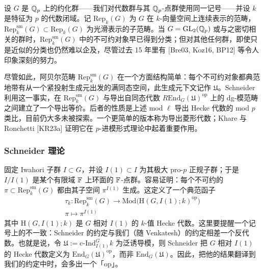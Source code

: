 设 $G$ 是 $\mathbb{Q}_p$ 上的约化群——我们对代数群与其 $\mathbb{Q}_p$-点群使用同一记号——并设 $k$ 是特征为 $p$ 的代数闭域。记 $\mathrm{Rep}_k(G)$ 为 $G$ 在 $k$-向量空间上连续表示的范畴，$\mathrm{Rep}^{\mathrm{sm}}_k(G)\subset\mathrm{Rep}_k(G)$ 为光滑表示的子范畴。当 $G=\mathrm{GL}_2(\mathbb{Q}_p)$ 或与之密切相关的群时，$\mathrm{Rep}^{\mathrm{sm}}_k(G)$ 中的不可约对象早已得到分类；但对其他任何群，即使只是近似的分类也仍然难以企及，尽管过去 15 年里有 [Bre03, Koz16, BP12] 等令人印象深刻的努力。

尽管如此，阿贝尔范畴 $\mathrm{Rep}^{\mathrm{sm}}_k(G)$ 在一个方面结构简单：每个不可约对象都典范地带有从一个紧投射生成元出发的满同态空间，此生成元下文记作 $\mathfrak U$。Schneider 利用这一事实，在 $\mathrm{Rep}^{\mathrm{sm}}_k(G)$ 与导出自同态代数 $R\mathrm{End}_G(\mathfrak U)^{\mathrm{op}}$ 上的 dg-模范畴之间建立了一个导出等价。后者的性质是上述 mod $\ell$ 导出 Hecke 代数的 mod $p$ 类比，目前仍大多未被探索。一个更简单的版本称为导出菱形代数；Khare 与 Ronchetti [KR23a] 证明它在 $p$-进模形式理论中起着重要作用。

\subsubsection{Schneider 理论}

固定 Iwahori 子群 $I\subset G$，并设 $I(1)\subset I$ 为其极大 pro-$p$ 正规子群；于是 $I/I(1)$ 是某个有限域 $\mathbb{F}$ 上环面的 $\mathbb{F}$-点群。容易证明：每个不可约的 $\pi\subset\mathrm{Rep}^{\mathrm{sm}}_k(G)$ 都由其子空间 $\pi^{I(1)}$ 生成。这定义了一个典范函子
\begin{equation}\tag{6.3.1}\label{eq:a6-04-8}
\begin{gathered}
\tau_k\colon\mathrm{Rep}^{\mathrm{sm}}_k(G)\to\mathrm{Mod}\bigl(\mathrm H(G,I(1);k)^{\mathrm{op}}\bigr)\\
\pi\mapsto\pi^{I(1)}
\end{gathered}
\end{equation}
其中 $\mathrm H(G,I(1);k)$ 是 $G$ 相对 $I(1)$ 的 $k$-值 Hecke 代数。这里要提醒一个记号上的不一致：Schneider 的约定与我们（随 Venkatesh）的约定相差一个反代数。也就是说，令 $\mathfrak U:=\mathrm{c\text{-}Ind}^G_{I(1)}k$ 为泛诱导模，则 Schneider 把 $G$ 相对 $I(1)$ 的 Hecke 代数定义为 $\mathrm{End}_G(\mathfrak U)^{\mathrm{op}}$，而非 $\mathrm{End}_G(\mathfrak U)$。因此，把他的结果翻译到我们的约定中时，会多出一个「op」。

